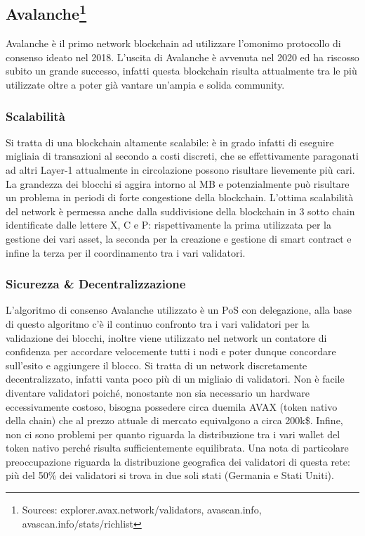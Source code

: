 \documentclass[a4paper, 12pt]{article}
\begin{document}
\newpage
\subsection*{Avalanche\footnote{Sources: explorer.avax.network/validators, avascan.info, avascan.info/stats/richlist}}
Avalanche è il primo network blockchain ad utilizzare l'omonimo protocollo di consenso ideato nel 2018. L'uscita di Avalanche è avvenuta nel 2020 ed ha riscosso subito un grande successo, infatti questa blockchain risulta attualmente tra le più utilizzate oltre a poter già vantare un'ampia e solida community.
\subsubsection*{Scalabilità}
Si tratta di una blockchain altamente scalabile: è in grado infatti di eseguire migliaia di transazioni al secondo a costi discreti, che se effettivamente paragonati ad altri Layer-1 attualmente in circolazione possono risultare lievemente più cari. La grandezza dei blocchi si aggira intorno al MB e potenzialmente può risultare un problema in periodi di forte congestione della blockchain. L'ottima scalabilità del network è permessa anche dalla suddivisione della blockchain in 3 sotto chain identificate dalle lettere X, C e P:  rispettivamente la prima utilizzata per la gestione dei vari asset, la seconda per la creazione e gestione di smart contract e infine la terza per il coordinamento tra i vari validatori.

\subsubsection*{Sicurezza \& Decentralizzazione}
L'algoritmo di consenso Avalanche utilizzato è un PoS con delegazione, alla base di questo algoritmo c'è il continuo confronto tra i vari validatori per la validazione dei blocchi, inoltre viene utilizzato nel network un contatore di confidenza per accordare velocemente tutti i nodi e poter dunque concordare sull'esito e aggiungere il blocco.
Si tratta di un network discretamente decentralizzato, infatti vanta poco più di un migliaio di validatori. Non è facile diventare validatori poiché, nonostante non sia necessario un hardware eccessivamente costoso, bisogna possedere circa duemila AVAX (token nativo della chain) che al prezzo attuale di mercato equivalgono a circa 200k\$. Infine, non ci sono problemi per quanto riguarda la distribuzione tra i vari wallet del token nativo perché risulta sufficientemente equilibrata.
Una nota di particolare preoccupazione riguarda la distribuzione geografica dei validatori di questa rete: più del 50\% dei validatori si trova in due soli stati (Germania e Stati Uniti).
\end{document}
